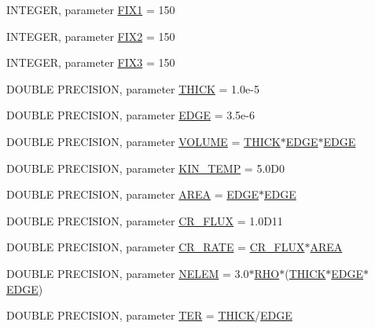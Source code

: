 \begin{DoxyCompactItemize}
INTEGER, parameter \hyperlink{namespaceparameters_a2fbeb743f79ed8a1c34482eb24ce3e87}{FIX1} = 150
\item 
INTEGER, parameter \hyperlink{namespaceparameters_a11cddb5a155baade8a969acb80c17292}{FIX2} = 150
\item 
INTEGER, parameter \hyperlink{namespaceparameters_adedf5e0e6373ffbf611e8767d9cf0e80}{FIX3} = 150
\item 
DOUBLE PRECISION, parameter \hyperlink{namespaceparameters_aacbd355b27d7e7459076fdf3f77fab20}{THICK} = 1.0e-\/5
\item 
DOUBLE PRECISION, parameter \hyperlink{namespaceparameters_a45377074e21edf9bd71351430490cd5e}{EDGE} = 3.5e-\/6
\item 
DOUBLE PRECISION, parameter \hyperlink{namespaceparameters_a8a887d07bb62f10ae5578c2a7181a578}{VOLUME} = \hyperlink{namespaceparameters_aacbd355b27d7e7459076fdf3f77fab20}{THICK}$\ast$\hyperlink{namespaceparameters_a45377074e21edf9bd71351430490cd5e}{EDGE}$\ast$\hyperlink{namespaceparameters_a45377074e21edf9bd71351430490cd5e}{EDGE}
\item 
DOUBLE PRECISION, parameter \hyperlink{namespaceparameters_a144dd87a3ad4a40138cad0b8d26ee282}{KIN\_\-TEMP} = 5.0D0
\item 
DOUBLE PRECISION, parameter \hyperlink{namespaceparameters_aee8d50a231f8beed7edc0ff5ba2437f4}{AREA} = \hyperlink{namespaceparameters_a45377074e21edf9bd71351430490cd5e}{EDGE}$\ast$\hyperlink{namespaceparameters_a45377074e21edf9bd71351430490cd5e}{EDGE}
\item 
DOUBLE PRECISION, parameter \hyperlink{namespaceparameters_ad9a62be82a2fb56fe291f73d3279d4b4}{CR\_\-FLUX} = 1.0D11
\item 
DOUBLE PRECISION, parameter \hyperlink{namespaceparameters_ac433c7adc61bc138dfc7567a570833ed}{CR\_\-RATE} = \hyperlink{namespaceparameters_ad9a62be82a2fb56fe291f73d3279d4b4}{CR\_\-FLUX}$\ast$\hyperlink{namespaceparameters_aee8d50a231f8beed7edc0ff5ba2437f4}{AREA}
\item 
DOUBLE PRECISION, parameter \hyperlink{namespaceparameters_a20c80b2e34c240feef7ac6887646115d}{NELEM} = 3.0$\ast$\hyperlink{namespaceparameters_ad8323286536365bb131984aa57af99df}{RHO}$\ast$(\hyperlink{namespaceparameters_aacbd355b27d7e7459076fdf3f77fab20}{THICK}$\ast$\hyperlink{namespaceparameters_a45377074e21edf9bd71351430490cd5e}{EDGE}$\ast$\hyperlink{namespaceparameters_a45377074e21edf9bd71351430490cd5e}{EDGE})
\item 
DOUBLE PRECISION, parameter \hyperlink{namespaceparameters_adc91f63a6d2c197941c445a5d64800a3}{TER} = \hyperlink{namespaceparameters_aacbd355b27d7e7459076fdf3f77fab20}{THICK}/\hyperlink{namespaceparameters_a45377074e21edf9bd71351430490cd5e}{EDGE}

\end{DoxyCompactItemize}
